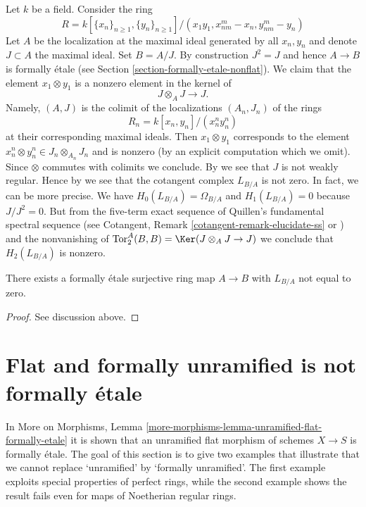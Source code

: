 \noindent
Let $k$ be a field. Consider the ring
$$
R = k[\{x_n\}_{n \geq 1}, \{y_n\}_{n \geq 1}]/(
x_1y_1, x_{nm}^m - x_n, y_{nm}^m - y_n)
$$
Let $A$ be the localization at the maximal ideal generated by
all $x_n, y_n$ and denote $J \subset A$ the maximal ideal. Set $B = A/J$.
By construction $J^2 = J$ and hence $A \to B$ is formally \'etale (see
Section \ref{section-formally-etale-nonflat}).
We claim that the element $x_1 \otimes y_1$ is a nonzero
element in the kernel of
$$
J \otimes_A J \longrightarrow J.
$$
Namely, $(A, J)$ is the colimit of the localizations
$(A_n, J_n)$ of the rings
$$
R_n = k[x_n, y_n]/(x_n^n y_n^n)
$$
at their corresponding maximal ideals. Then
$x_1 \otimes y_1$ corresponds to the element
$x_n^n \otimes y_n^n \in J_n \otimes_{A_n} J_n$ and is nonzero
(by an explicit computation which we omit). Since $\otimes$ commutes
with colimits we conclude. By
\cite[III Section 3.3]{cotangent}
we see that $J$ is not weakly regular. Hence by
\cite[III Proposition 3.3.3]{cotangent}
we see that the cotangent complex $L_{B/A}$ is not zero. In fact, we can
be more precise. We have $H_0(L_{B/A}) = \Omega_{B/A}$ and
$H_1(L_{B/A}) = 0$ because $J/J^2 = 0$. But from the five-term exact sequence
of Quillen's fundamental spectral sequence
(see Cotangent, Remark \ref{cotangent-remark-elucidate-ss} or
\cite[Corollary 8.2.6]{Reinhard})
and the nonvanishing of
$\text{Tor}_2^A(B, B) = \Ker(J \otimes_A J \to J)$ we conclude that
$H_2(L_{B/A})$ is nonzero.

\begin{lemma}
\label{lemma-formally-etale-nontrivial-cotangent-complex}
There exists a formally \'etale surjective ring map $A \to B$
with $L_{B/A}$ not equal to zero.
\end{lemma}

\begin{proof}
See discussion above.
\end{proof}






\section{Flat and formally unramified is not formally \'etale}
\label{section-flat-formally-unramified-not-formally-etale}

\noindent
In More on Morphisms, Lemma
\ref{more-morphisms-lemma-unramified-flat-formally-etale}
it is shown that an unramified flat morphism of schemes $X \to S$
is formally \'etale. The goal of this section is to give two examples
that illustrate that we cannot replace `unramified' by `formally unramified'.
The first example exploits special properties of perfect rings, while the
second example shows the result fails even for maps of Noetherian regular rings.

